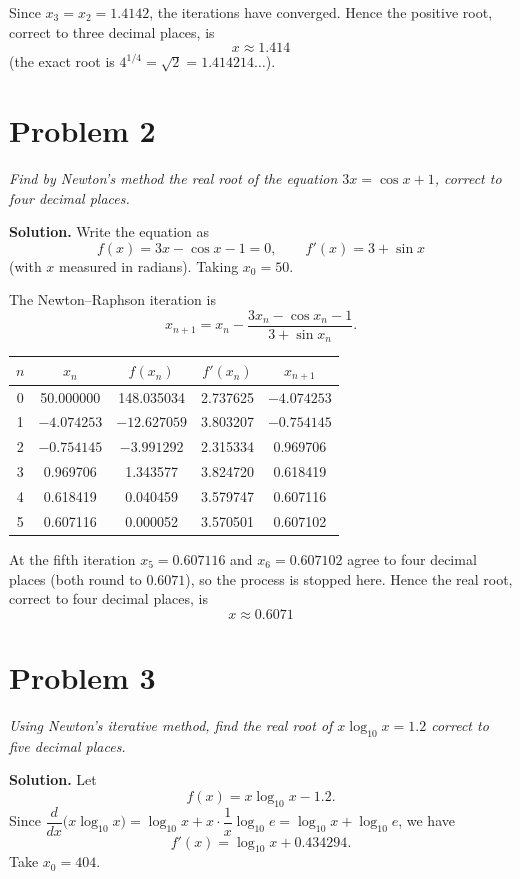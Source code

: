 \documentclass[11pt,a4paper]{article}
\begin{document}
Since $x_{3}=x_{2}=1.4142$, the iterations have converged. Hence the positive root,
correct to three decimal places, is
\[
\boxed{x \approx 1.414}
\]
(the exact root is $4^{1/4}=\sqrt{2}=1.414214\ldots$).

\section*{Problem 2}
\textit{Find by Newton's method the real root of the equation $3x=\cos x+1$, correct
to four decimal places.}

\textbf{Solution.} Write the equation as
\[
f(x)=3x-\cos x-1=0, \qquad f'(x)=3+\sin x
\]
(with $x$ measured in radians). Taking $x_{0}=50$.

The Newton--Raphson iteration is
\[
x_{n+1}=x_{n}-\frac{3x_{n}-\cos x_{n}-1}{3+\sin x_{n}}.
\]

\begin{center}
\begin{tabular}{ccccc}
\toprule
$n$ & $x_{n}$ & $f(x_{n})$ & $f'(x_{n})$ & $x_{n+1}$ \\
\midrule
0 & 50.000000  & 148.035034 & 2.737625 & $-4.074253$ \\
1 & $-4.074253$ & $-12.627059$ & 3.803207 & $-0.754145$ \\
2 & $-0.754145$ & $-3.991292$ & 2.315334 & 0.969706 \\
3 & 0.969706   & 1.343577 & 3.824720 & 0.618419 \\
4 & 0.618419   & 0.040459 & 3.579747 & 0.607116 \\
5 & 0.607116   & 0.000052 & 3.570501 & 0.607102 \\
\bottomrule
\end{tabular}
\end{center}
 At the fifth iteration $x_{5}=0.607116$ and
$x_{6}=0.607102$ agree to four decimal places (both round to $0.6071$), so the
process is stopped here. Hence the real root, correct to four decimal places, is
\[
\boxed{x \approx 0.6071}
\]
\section*{Problem 3}
\textit{Using Newton's iterative method, find the real root of $x\log_{10}x=1.2$
correct to five decimal places.}

\textbf{Solution.} Let
\[
f(x)=x\log_{10}x-1.2 .
\]
Since $\dfrac{d}{dx}\bigl(x\log_{10}x\bigr)=\log_{10}x+x\cdot\dfrac{1}{x}\log_{10}e
=\log_{10}x+\log_{10}e$, we have
\[
f'(x)=\log_{10}x+0.434294 .
\]
Take $x_{0}=404$.
\end{document}
